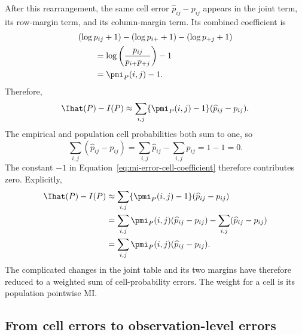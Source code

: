 After this rearrangement, the same cell error \(\widehat p_{ij}-p_{ij}\)
appears in the joint term, its
row-margin term, and its column-margin term. Its combined coefficient is
\begin{align}
  &(\log p_{ij}+1)
  -(\log p_{i+}+1)
  -(\log p_{+j}+1)
  \notag\\
  &\qquad
  =\log\left(\frac{p_{ij}}{p_{i+}p_{+j}}\right)-1
  \notag\\
  &\qquad
  =\pmi_P(i,j)-1.
  \label{eq:mi-error-cell-coefficient}
\end{align}
Therefore,
\begin{equation}
  \Ihat(P)-I(P)
  \approx
  \sum_{i,j}\{\pmi_P(i,j)-1\}(\widehat p_{ij}-p_{ij}).
  \label{eq:mi-error-before-constant-cancellation}
\end{equation}
The empirical and population cell probabilities both sum to one, so
\begin{equation}
  \sum_{i,j}(\widehat p_{ij}-p_{ij})
  =\sum_{i,j}\widehat p_{ij}-\sum_{i,j}p_{ij}
  =1-1=0.
  \label{eq:cell-errors-sum-zero}
\end{equation}
The constant \(-1\) in Equation~\eqref{eq:mi-error-cell-coefficient} therefore
contributes zero. Explicitly,
\begin{align}
  \Ihat(P)-I(P)
  &\approx
  \sum_{i,j}\{\pmi_P(i,j)-1\}(\widehat p_{ij}-p_{ij})
  \notag\\
  &=\sum_{i,j}\pmi_P(i,j)(\widehat p_{ij}-p_{ij})
    -\sum_{i,j}(\widehat p_{ij}-p_{ij})
  \notag\\
  &=\sum_{i,j}
  \pmi_P(i,j)(\widehat p_{ij}-p_{ij}).
  \label{eq:mi-error-from-cell-errors}
\end{align}
The complicated changes in the joint table and its two margins have therefore
reduced to a weighted sum of cell-probability errors. The weight for a cell is
its population pointwise MI.

\subsection{From cell errors to observation-level errors}

